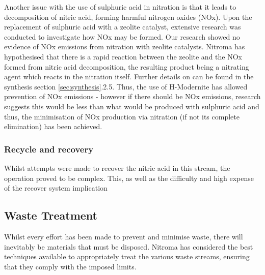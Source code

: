 Another issue with the use of sulphuric acid in nitration is that it leads to decomposition of nitric acid, forming harmful nitrogen oxides (NOx). Upon the replacement of sulphuric acid with a zeolite catalyst, extensive research was conducted to investigate how NOx may be formed. Our research showed no evidence of NOx emissions from nitration with zeolite catalysts. Nitroma has hypothesised that there is a rapid reaction between the zeolite and the NOx formed from nitric acid decomposition, the resulting product being a nitrating agent which reacts in the nitration itself. Further details on can be found in the synthesis section \ref{sec:synthesis}.2.5. Thus, the use of H-Modernite has allowed prevention of NOx emissions - however if there should be NOx emissions, research suggests this would be less than what would be produced with sulphuric acid and thus, the minimisation of NOx production via nitration (if not its complete elimination) has been achieved.  

\subsubsection{Recycle and recovery}


 


Whilst attempts were made to recover the nitric acid in this stream, the operation proved to be complex. This, as well as the difficulty and high expense of the recover system implication 

\subsection{Waste Treatment}
\label{sec:waste}

Whilst every effort has been made to prevent and minimise waste, there will inevitably be materials that must be disposed. Nitroma has considered the best techniques available to appropriately treat the various waste streams, ensuring that they comply with the imposed limits. 

